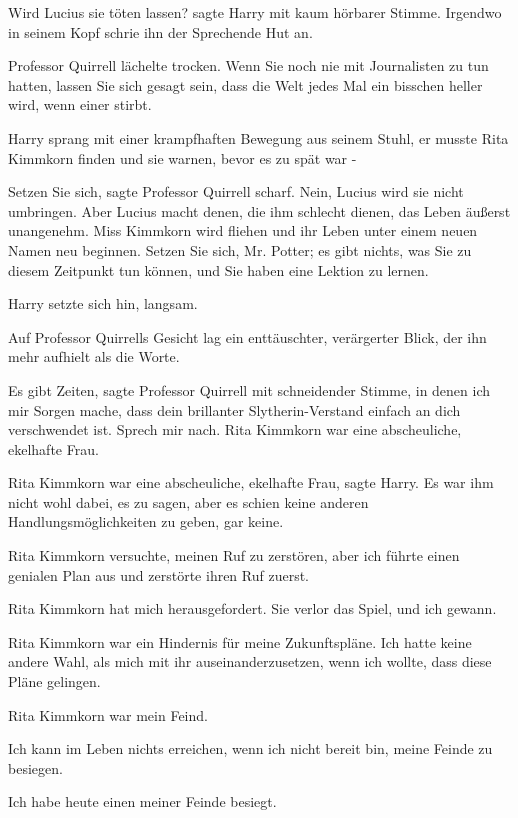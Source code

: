 \glqq{}Wird Lucius sie töten lassen?\grqq{} sagte Harry mit kaum hörbarer Stimme.
Irgendwo in seinem Kopf schrie ihn der Sprechende Hut an.

Professor Quirrell lächelte trocken. \glqq{}Wenn Sie noch nie mit Journalisten zu
tun hatten, lassen Sie sich gesagt sein, dass die Welt jedes Mal ein bisschen
heller wird, wenn einer stirbt.\grqq{}

Harry sprang mit einer krampfhaften Bewegung aus seinem Stuhl, er musste Rita
Kimmkorn finden und sie warnen, bevor es zu spät war -

\glqq{}Setzen Sie sich\grqq{}, sagte Professor Quirrell scharf. \glqq{}Nein,
Lucius wird sie nicht umbringen. Aber Lucius macht denen, die ihm schlecht
dienen, das Leben äußerst unangenehm. Miss Kimmkorn wird fliehen und ihr Leben
unter einem neuen Namen neu beginnen. Setzen Sie sich, Mr. Potter; es gibt
nichts, was Sie zu diesem Zeitpunkt tun können, und Sie haben eine Lektion zu
lernen.\grqq{}

Harry setzte sich hin, langsam.

Auf Professor Quirrells Gesicht lag ein enttäuschter, verärgerter Blick, der ihn
mehr aufhielt als die Worte.

\glqq{}Es gibt Zeiten\grqq{}, sagte Professor Quirrell mit schneidender Stimme,
\glqq{}in denen ich mir Sorgen mache, dass dein brillanter Slytherin-Verstand
einfach an dich verschwendet ist. Sprech mir nach. Rita Kimmkorn war eine
abscheuliche, ekelhafte Frau.\grqq{}

\glqq{}Rita Kimmkorn war eine abscheuliche, ekelhafte Frau\grqq{}, sagte Harry.
Es war ihm nicht wohl dabei, es zu sagen, aber es schien keine anderen
Handlungsmöglichkeiten zu geben, gar keine.

\glqq{}Rita Kimmkorn versuchte, meinen Ruf zu zerstören, aber ich führte einen
genialen Plan aus und zerstörte ihren Ruf zuerst.\grqq{}

\glqq{}Rita Kimmkorn hat mich herausgefordert. Sie verlor das Spiel, und ich
gewann.\grqq{}

\glqq{}Rita Kimmkorn war ein Hindernis für meine Zukunftspläne. Ich hatte keine
andere Wahl, als mich mit ihr auseinanderzusetzen, wenn ich wollte, dass diese
Pläne gelingen.\grqq{}

\glqq{}Rita Kimmkorn war mein Feind.\grqq{}

\glqq{}Ich kann im Leben nichts erreichen, wenn ich nicht bereit bin, meine
Feinde zu besiegen.\grqq{}

\glqq{}Ich habe heute einen meiner Feinde besiegt.\grqq{}

